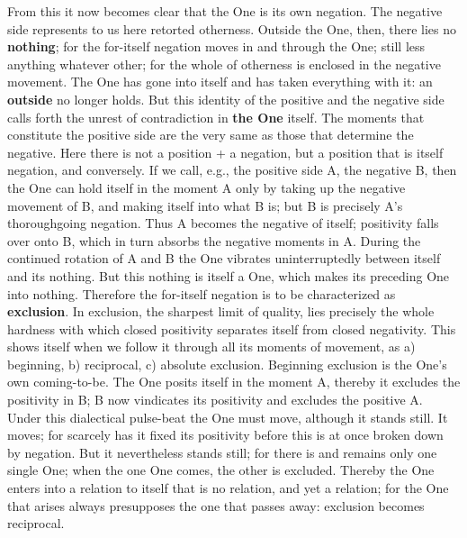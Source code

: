 \documentclass[12pt,a4paper,openany]{book}
\newcommand{\opage}[1]{\marginnote{\footnotesize\textit{[#1]}}}
\begin{document}
From this it now becomes clear that the One is its own negation. The negative side represents to us here
retorted otherness. Outside the One, then, there lies no
\textbf{nothing}; for the for-itself negation moves
in and through the One; still less anything whatever
other; for the whole of otherness is enclosed in the negative
movement. The One has gone into itself and has taken everything
with it: an \textbf{outside} no longer holds. But this identity of the positive and the negative
side calls forth the unrest of contradiction in \textbf{the One} itself. The moments that constitute the positive side are the
very same as those that determine the negative. Here
there is not a position + a negation, but a position
that is itself negation, and conversely. If we call,
e.g., the positive side A, the negative B, then the One
can hold itself in the moment A only by
taking up the negative movement of B, and making itself
into what B is; but B is precisely A's thoroughgoing
negation. Thus A becomes the negative of itself;
positivity falls over onto B, which in turn absorbs the
negative moments in A. During the continued rotation of A and B
the One vibrates uninterruptedly between itself and its
nothing.
\setcounter{footnote}{0}%
\opage{23}But this nothing is itself a One, which makes its preceding
One into nothing. Therefore the for-itself negation is to be characterized as \textbf{exclusion}. In exclusion, the sharpest limit of quality, lies
precisely the whole hardness with which closed
positivity separates itself from closed negativity.
This shows itself when we follow it through all
its moments of movement, as a) beginning,
b) reciprocal, c) absolute exclusion. Beginning exclusion is the One's own coming-to-be.
The One posits itself in the moment A, thereby it excludes
the positivity in B; B now vindicates its positivity
and excludes the positive A. Under this dialectical
pulse-beat the One must move, although it stands
still. It moves; for scarcely has it fixed its
positivity before this is at once broken down by negation.
But it nevertheless stands still; for there is and remains only
one single One; when the one One comes, the other is
excluded. Thereby the One enters into a relation to
itself that is no relation, and yet a relation;
for the One that arises always presupposes the one that
passes away: exclusion becomes reciprocal.
\end{document}
